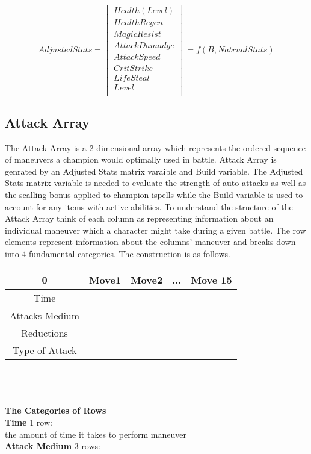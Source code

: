 \documentclass{article}
\begin{document}
\begin{equation}
Adjusted Stats = 
\begin{vmatrix}
	Health(Level)\\
	Health Regen\\
	Magic Resist \\
	Attack Damadge \\
	Attack Speed \\
	Crit Strike \\
	Life Steal \\
	Level \\
\end{vmatrix} = f(B,Natrual Stats)
\end{equation}

\newpage
\subsection{Attack Array}
The Attack Array is a 2 dimensional array which represents the ordered sequence of maneuvers a champion would optimally used in battle.  Attack Array is genrated by an Adjusted Stats matrix varaible and Build variable.  The Adjusted Stats matrix variable is needed to evaluate the strength of auto attacks as well as the scalling bonus applied to champion ispells while the Build variable is used to account for any items with active abilities.  To understand the structure of the Attack Array think of each column as representing information about an individual maneuver which a character might take during a given battle. The row elements represent information about the columns' maneuver and breaks down into 4 fundamental categories.  The construction is as follows.\\
\begin{tabular}{|c|c|c|c|c|} 
0 & Move1 & Move2 & ...& Move 15\\  \hline
Time & & & &\\  \hline 
Attacks Medium & & & & \\  \hline 
Reductions & & & &\\  \hline
Type of Attack & & & &\\  \hline
\end{tabular} \\\\\\
{\bf{The Categories of Rows}}\\
{\bf Time} 1 row:\\
 the amount of time it takes to perform maneuver\\
{\bf Attack Medium} 3 rows:\\
\end{document}
